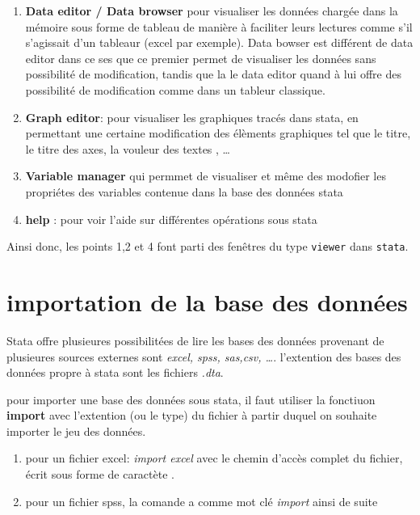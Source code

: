\documentclass[
]{book}
\providecommand{\tightlist}{%
  \setlength{\itemsep}{0pt}\setlength{\parskip}{0pt}}
\begin{document}
\begin{enumerate}
\def\labelenumi{(\arabic{enumi})}
\tightlist
\item
  \textbf{Data editor / Data browser} pour visualiser les données chargée dans la mémoire sous forme de tableau de manière à faciliter leurs lectures comme s'il s'agissait d'un tableaur (excel par exemple).
  Data bowser est différent de data editor dans ce ses que ce premier permet de visualiser les données sans possibilité de modification, tandis que la le data editor quand à lui offre des possibilité de modification comme dans un tableur classique.
\item
  \textbf{Graph editor}: pour visualiser les graphiques tracés dans stata, en permettant une certaine modification des élèments graphiques tel que le titre, le titre des axes, la vouleur des textes , \ldots{}
\item
  \textbf{Variable manager} qui permmet de visualiser et même des modofier les propriétes des variables contenue dans la base des données stata
\item
  \textbf{help} : pour voir l'aide sur différentes opérations sous stata
\end{enumerate}

Ainsi donc, les points 1,2 et 4 font parti des fenêtres du type \texttt{viewer} dans \texttt{stata}.

\hypertarget{importation-de-la-base-des-donnuxe9es}{%
\section{importation de la base des données}\label{importation-de-la-base-des-donnuxe9es}}

Stata offre plusieures possibilitées de lire les bases des données provenant de plusieures sources externes sont \emph{excel, spss, sas,csv, \ldots{}}.
l'extention des bases des données propre à stata sont les fichiers \emph{.dta}.

pour importer une base des données sous stata, il faut utiliser la fonctiuon \textbf{import} avec l'extention (ou le type) du fichier à partir duquel on souhaite importer le jeu des données.

\begin{enumerate}
\def\labelenumi{(\arabic{enumi})}
\tightlist
\item
  pour un fichier excel: \emph{import excel} avec le chemin d'accès complet du fichier, écrit sous forme de caractète .
\item
  pour un fichier spss, la comande a comme mot clé \emph{import }
  ainsi de suite
\end{enumerate}
\end{document}
